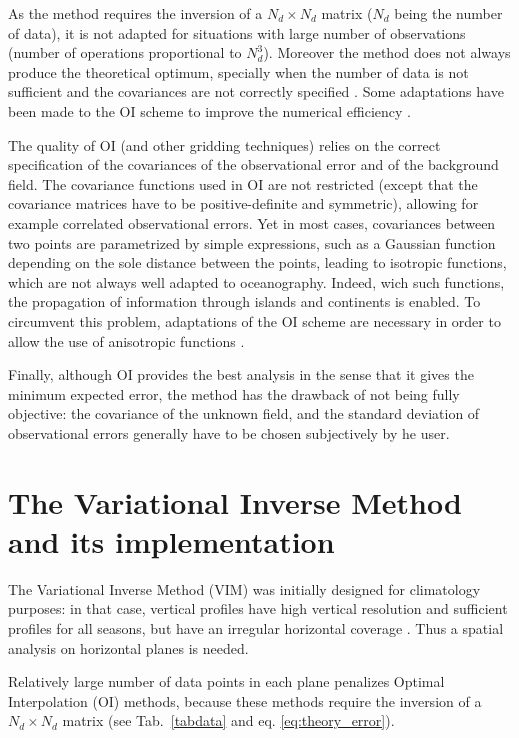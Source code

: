 As the method requires the inversion of a $N_{d} \times N_{d}$ matrix ($N_{d}$ being the number of data), it is not adapted for situations with large number of observations (number of operations proportional to $N_{d}^{3}$). Moreover the method does not always produce the theoretical optimum, specially when the number of data is not sufficient and the covariances are not correctly specified \citep[e.g.,][]{RIXEN00,GOMIS01}. Some adaptations have been made to the OI scheme to improve the numerical efficiency \citep[e.g.,][]{HARTMAN08,ZHANG10}.

The quality of OI (and other gridding techniques) relies on the correct specification of the covariances of the observational error and of the background field. The covariance functions used in OI are not restricted (except that the covariance matrices have to be positive-definite and symmetric), allowing for example correlated observational errors. Yet in most cases, covariances between two points are parametrized by simple expressions, such as a Gaussian function depending on the sole distance between the points, leading to isotropic functions, which are not always well adapted to oceanography. Indeed, wich such functions, the propagation of information through islands and continents is enabled. To circumvent this problem, adaptations of the OI scheme are necessary in order to allow the use of anisotropic functions \citep[e.g.,][]{TANDEO11}.

Finally, although OI provides the best analysis in the sense that it gives the minimum expected error, the method has the drawback of not being fully objective: the covariance of the unknown field, and the standard deviation of observational errors generally have to be chosen subjectively by he user.

\section[Variational Inverse Method]{The Variational Inverse Method and its implementation}

The Variational Inverse Method (VIM) was initially designed for climatology purposes: in that case, vertical profiles have high vertical resolution and sufficient profiles for all seasons, but have an irregular horizontal coverage \citep{BRASSEUR96}. Thus a spatial analysis on horizontal planes is needed. 

Relatively large number of data points in each plane penalizes Optimal Interpolation (OI) methods, because these methods require the inversion of a $N_{d} \times N_{d}$ matrix (see Tab.~\ref{tabdata} and eq. \ref{eq:theory_error}).

